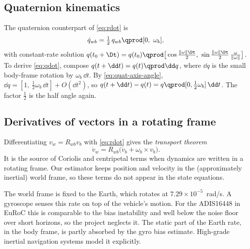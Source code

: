 \subsection{Quaternion kinematics}

The quaternion counterpart of \eqref{eq:rdot} is
\begin{equation}
  \dot q_{wb} = \tfrac12\, q_{wb} \qprod [0,\ \omega_b],
  \label{eq:qdot}
\end{equation}
with constant-rate solution $q(t_0 + \Dt) = q(t_0)\qprod\big[\cos\tfrac{\|\omega\|\Dt}{2},\
\sin\tfrac{\|\omega\|\Dt}{2}\,\tfrac{\omega}{\|\omega\|}\big]$. To derive \eqref{eq:qdot}, compose
$q(t + \dd t) = q(t) \qprod \dd q$, where $\dd q$ is the small body-frame rotation by
$\omega_b\,\dd t$. By \eqref{eq:quat-axis-angle}, $\dd q = [1,\ \tfrac12\omega_b\,\dd t] + O(\dd t^2)$,
so $q(t + \dd t) - q(t) = q\qprod[0, \tfrac12\omega_b]\,\dd t$. The factor $\tfrac12$ is the half angle
again.

\subsection{Derivatives of vectors in a rotating frame}

Differentiating $v_w = R_{wb}v_b$ with \eqref{eq:rdot} gives the \emph{transport theorem}
\begin{equation}
  \dot v_w = R_{wb}\big(\dot v_b + \omega_b \times v_b\big).
\end{equation}
It is the source of Coriolis and centripetal terms when dynamics are written in a rotating frame.
Our estimator keeps position and velocity in the (approximately inertial) world frame, so these terms
do not appear in the state equations.

\begin{remark}
The world frame is fixed to the Earth, which rotates at $7.29\times10^{-5}$~rad/s. A gyroscope senses
this rate on top of the vehicle's motion. For the ADIS16448 in EuRoC this is comparable to the bias
instability and well below the noise floor over short horizons, so the project neglects it. The
static part of the Earth rate, in the body frame, is partly absorbed by the gyro bias estimate. High-grade
inertial navigation systems model it explicitly.
\end{remark}

